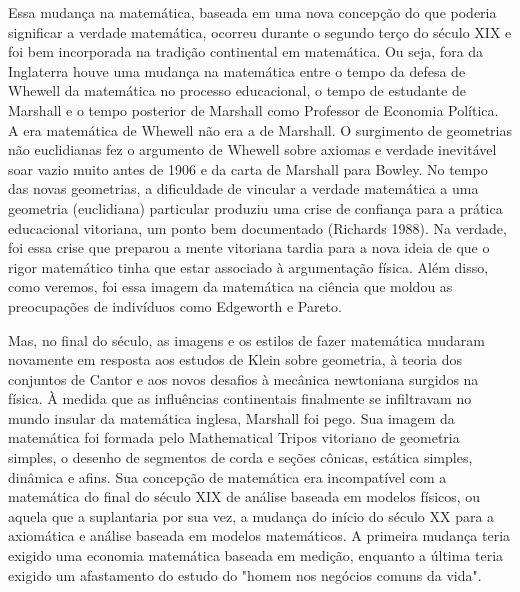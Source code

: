 \documentclass[a4paper,12pt]{article}[abntex2]
\begin{document}
Essa mudança na matemática, baseada em uma nova concepção do que poderia significar a verdade matemática, ocorreu durante o segundo terço do século XIX e foi bem incorporada na tradição continental em matemática. Ou seja, fora da Inglaterra houve uma mudança na matemática entre o tempo da defesa de Whewell da matemática no processo educacional, o tempo de estudante de Marshall e o tempo posterior de Marshall como Professor de Economia Política. A era matemática de Whewell não era a de Marshall. O surgimento de geometrias não euclidianas fez o argumento de Whewell sobre axiomas e verdade inevitável soar vazio muito antes de 1906 e da carta de Marshall para Bowley. No tempo das novas geometrias, a dificuldade de vincular a verdade matemática a uma geometria (euclidiana) particular produziu uma crise de confiança para a prática educacional vitoriana, um ponto bem documentado (Richards 1988). Na verdade, foi essa crise que preparou a mente vitoriana tardia para a nova ideia de que o rigor matemático tinha que estar associado à argumentação física. Além disso, como veremos, foi essa imagem da matemática na ciência que moldou as preocupações de indivíduos como Edgeworth e Pareto.

Mas, no final do século, as imagens e os estilos de fazer matemática mudaram novamente em resposta aos estudos de Klein sobre geometria, à teoria dos conjuntos de Cantor e aos novos desafios à mecânica newtoniana surgidos na física. À medida que as influências continentais finalmente se infiltravam no mundo insular da matemática inglesa, Marshall foi pego. Sua imagem da matemática foi formada pelo Mathematical Tripos vitoriano de geometria simples, o desenho de segmentos de corda e seções cônicas, estática simples, dinâmica e afins. Sua concepção de matemática era incompatível com a matemática do final do século XIX de análise baseada em modelos físicos, ou aquela que a suplantaria por sua vez, a mudança do início do século XX para a axiomática e análise baseada em modelos matemáticos. A primeira mudança teria exigido uma economia matemática baseada em medição, enquanto a última teria exigido um afastamento do estudo do "homem nos negócios comuns da vida".
\end{document}
